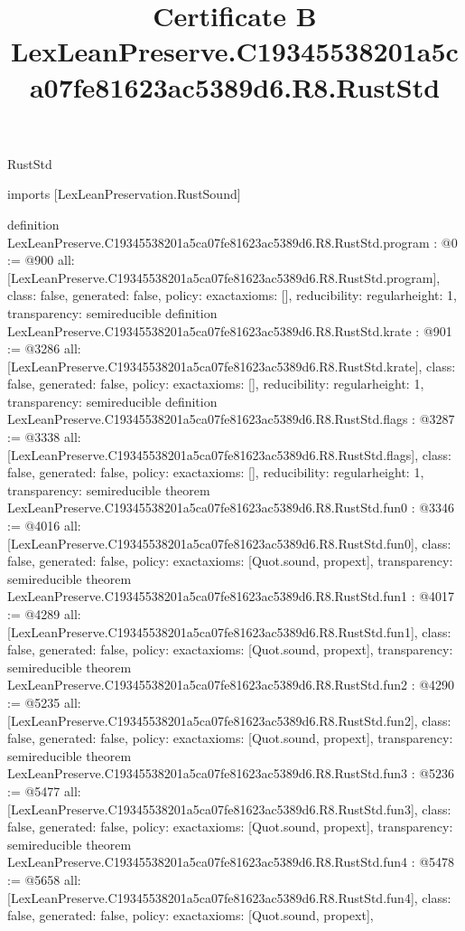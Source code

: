 \begin{lexlean}{RustStd}
\title{Certificate B LexLeanPreserve.C19345538201a5ca07fe81623ac5389d6.R8.RustStd}
\begin{coremodule}
imports [LexLeanPreservation.RustSound]

definition LexLeanPreserve.C19345538201a5ca07fe81623ac5389d6.R8.RustStd.program : @0 := @900 {
  all: [LexLeanPreserve.C19345538201a5ca07fe81623ac5389d6.R8.RustStd.program],
  class: false,
  generated: false,
  policy: exact{axioms: []},
  reducibility: regular{height: 1},
  transparency: semireducible
}
definition LexLeanPreserve.C19345538201a5ca07fe81623ac5389d6.R8.RustStd.krate : @901 := @3286 {
  all: [LexLeanPreserve.C19345538201a5ca07fe81623ac5389d6.R8.RustStd.krate],
  class: false,
  generated: false,
  policy: exact{axioms: []},
  reducibility: regular{height: 1},
  transparency: semireducible
}
definition LexLeanPreserve.C19345538201a5ca07fe81623ac5389d6.R8.RustStd.flags : @3287 := @3338 {
  all: [LexLeanPreserve.C19345538201a5ca07fe81623ac5389d6.R8.RustStd.flags],
  class: false,
  generated: false,
  policy: exact{axioms: []},
  reducibility: regular{height: 1},
  transparency: semireducible
}
theorem LexLeanPreserve.C19345538201a5ca07fe81623ac5389d6.R8.RustStd.fun0 : @3346 := @4016 {
  all: [LexLeanPreserve.C19345538201a5ca07fe81623ac5389d6.R8.RustStd.fun0],
  class: false,
  generated: false,
  policy: exact{axioms: [Quot.sound, propext]},
  transparency: semireducible
}
theorem LexLeanPreserve.C19345538201a5ca07fe81623ac5389d6.R8.RustStd.fun1 : @4017 := @4289 {
  all: [LexLeanPreserve.C19345538201a5ca07fe81623ac5389d6.R8.RustStd.fun1],
  class: false,
  generated: false,
  policy: exact{axioms: [Quot.sound, propext]},
  transparency: semireducible
}
theorem LexLeanPreserve.C19345538201a5ca07fe81623ac5389d6.R8.RustStd.fun2 : @4290 := @5235 {
  all: [LexLeanPreserve.C19345538201a5ca07fe81623ac5389d6.R8.RustStd.fun2],
  class: false,
  generated: false,
  policy: exact{axioms: [Quot.sound, propext]},
  transparency: semireducible
}
theorem LexLeanPreserve.C19345538201a5ca07fe81623ac5389d6.R8.RustStd.fun3 : @5236 := @5477 {
  all: [LexLeanPreserve.C19345538201a5ca07fe81623ac5389d6.R8.RustStd.fun3],
  class: false,
  generated: false,
  policy: exact{axioms: [Quot.sound, propext]},
  transparency: semireducible
}
theorem LexLeanPreserve.C19345538201a5ca07fe81623ac5389d6.R8.RustStd.fun4 : @5478 := @5658 {
  all: [LexLeanPreserve.C19345538201a5ca07fe81623ac5389d6.R8.RustStd.fun4],
  class: false,
  generated: false,
  policy: exact{axioms: [Quot.sound, propext]},
}
\end{coremodule}
\end{lexlean}
